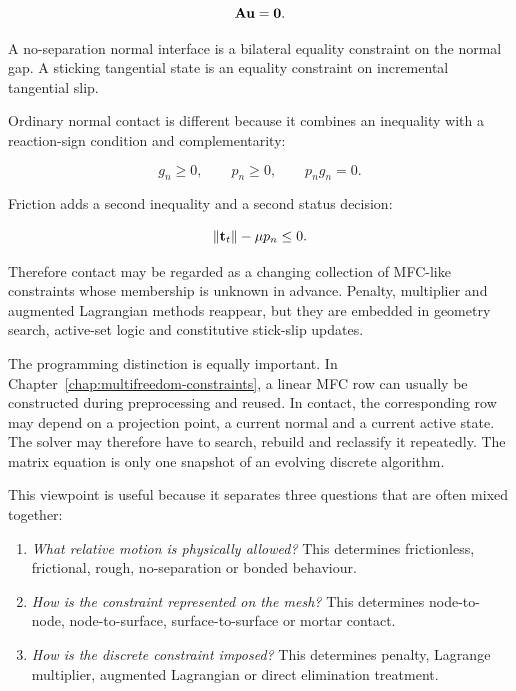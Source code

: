 \begin{equation}
    \mathbf{A}\mathbf{u}=\mathbf{0}.
\end{equation}

A no-separation normal interface is a bilateral equality constraint on the
normal gap. A sticking tangential state is an equality constraint on incremental
tangential slip.

Ordinary normal contact is different because it combines an inequality with a
reaction-sign condition and complementarity:

\begin{equation}
    g_n \geq 0, \qquad p_n \geq 0, \qquad p_n g_n=0.
\end{equation}

Friction adds a second inequality and a second status decision:

\begin{equation}
    \| {\mathbf{t}_t} \| - \mu p_n \leq 0.
\end{equation}

Therefore contact may be regarded as a changing collection of MFC-like
constraints whose membership is unknown in advance. Penalty, multiplier and
augmented Lagrangian methods reappear, but they are embedded in geometry search,
active-set logic and constitutive stick-slip updates.

The programming distinction is equally important. In Chapter~\ref{chap:multifreedom-constraints},
a linear MFC row can usually be constructed during preprocessing and reused.
In contact, the corresponding row may depend on a projection point, a current
normal and a current active state. The solver may therefore have to search,
rebuild and reclassify it repeatedly. The matrix equation is only one snapshot
of an evolving discrete algorithm.

This viewpoint is useful because it separates three questions that are often
mixed together:

\begin{enumerate}
    \item \textit{What relative motion is physically allowed?}
        This determines frictionless, frictional, rough, no-separation or bonded
        behaviour.

    \item \textit{How is the constraint represented on the mesh?}
        This determines node-to-node, node-to-surface, surface-to-surface or
        mortar contact.

    \item \textit{How is the discrete constraint imposed?}
        This determines penalty, Lagrange multiplier, augmented Lagrangian or
        direct elimination treatment.
\end{enumerate}

